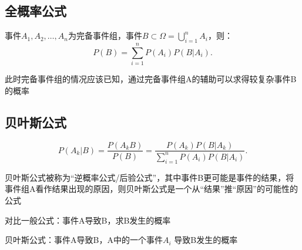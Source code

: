 \subsection{全概率公式}%
\label{sub:全概率公式}
\begin{cor}
    事件$A_1,A_2,\ldots,A_n$为完备事件组，事件$B\subset \Omega=\bigcup_{i=1}^{n}A_i$，则：\[
        P\left( B \right) =\sum_{i=1}^{n} P\left( A_i \right) P\left( B|A_i \right) 
    .\] 
\end{cor}
\begin{notation}
    此时完备事件组的情况应该已知，通过完备事件组A的辅助可以求得较复杂事件B的概率
\end{notation}


\subsection{贝叶斯公式}%
\label{sub:贝叶斯公式}
\begin{cor}
    \[
        P\left( A_{k}|B \right) =\frac{P\left( A_{k}B \right) }{P\left( B \right) }=\frac{P\left( A_{k} \right) P\left( B|A_k \right) }{\sum_{i=1}^{n} P\left( A_i \right) P\left( B|A_i \right)}
    .\] 
\end{cor}
贝叶斯公式被称为“逆概率公式/后验公式”，其中事件B更可能是事件的结果，将事件组A看作结果出现的原因，则贝叶斯公式是一个从“结果”推“原因”的可能性的公式

\begin{notation}
    对比一般公式：事件A导致B，求B发生的概率

    贝叶斯公式：事件A导致B，A中的一个事件$A_i$ 导致B发生的概率
\end{notation}

